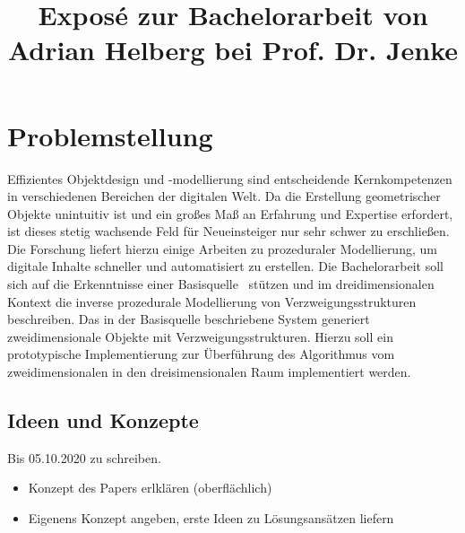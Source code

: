 \documentclass[11pt]{article}
\title{\textbf{Exposé} zur Bachelorarbeit von Adrian Helberg bei Prof. Dr. Jenke}
\begin{document}
    \maketitle

    \section{Problemstellung}

    Effizientes Objektdesign und -modellierung sind entscheidende Kernkompetenzen in verschiedenen Bereichen der
    digitalen Welt.
    Da die Erstellung geometrischer Objekte unintuitiv ist und ein großes Maß an Erfahrung und Expertise
    erfordert, ist dieses stetig wachsende Feld für Neueinsteiger nur sehr schwer zu erschließen.
    Die Forschung liefert hierzu einige Arbeiten zu prozeduraler Modellierung, um digitale Inhalte schneller und
    automatisiert zu erstellen.
    Die Bachelorarbeit soll sich auf die Erkenntnisse einer Basisquelle~\cite{basisquelle} stützen und im
    dreidimensionalen Kontext die inverse prozedurale Modellierung von Verzweigungsstrukturen beschreiben.
    Das in der Basisquelle beschriebene System generiert zweidimensionale Objekte mit Verzweigungsstrukturen.
    Hierzu soll ein prototypische Implementierung zur Überführung des Algorithmus vom zweidimensionalen in den
    dreisimensionalen Raum implementiert werden.\\

    \subsection{Ideen und Konzepte}
    Bis 05.10.2020 zu schreiben.
    \begin{itemize}
        \item Konzept des Papers erlklären (oberflächlich)
        \item Eigenens Konzept angeben, erste Ideen zu Lösungsansätzen liefern
    \end{itemize}
\end{document}
